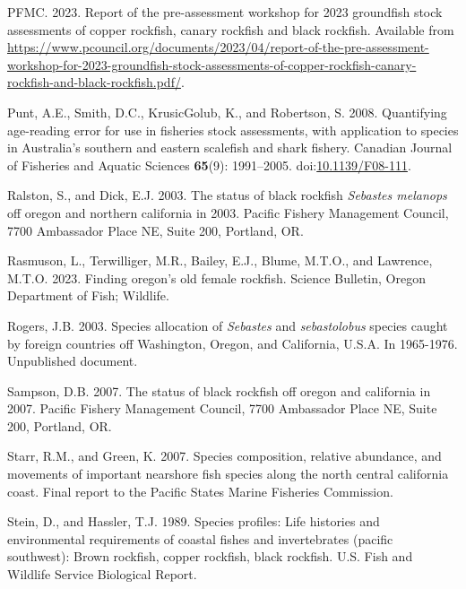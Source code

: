 \documentclass[11pt,
  letterpaper,
]{article}
\newlength{\cslhangindent}
\newenvironment{CSLReferences}[2] %
 {%
  \setlength{\parindent}{0pt}
  \ifodd #1 \everypar{\setlength{\hangindent}{\cslhangindent}}\ignorespaces\fi
  \ifnum #2 > 0
  \setlength{\parskip}{#2\baselineskip}
  \fi
 }%
 {}
\begin{document}
\begin{CSLReferences}{1}{0}
\leavevmode{}%
PFMC. 2023. Report of the pre-assessment workshop for 2023 groundfish stock assessments of copper rockfish, canary rockfish and black rockfish. Available from \url{https://www.pcouncil.org/documents/2023/04/report-of-the-pre-assessment-workshop-for-2023-groundfish-stock-assessments-of-copper-rockfish-canary-rockfish-and-black-rockfish.pdf/}.

\leavevmode{}%
Punt, A.E., Smith, D.C., KrusicGolub, K., and Robertson, S. 2008. Quantifying age-reading error for use in fisheries stock assessments, with application to species in {A}ustralia's southern and eastern scalefish and shark fishery. Canadian Journal of Fisheries and Aquatic Sciences \textbf{65}(9): 1991--2005. doi:\href{https://doi.org/10.1139/F08-111}{10.1139/F08-111}.

\leavevmode{}%
Ralston, S., and Dick, E.J. 2003. The status of black rockfish \emph{{Sebastes} melanops} off oregon and northern california in 2003. Pacific Fishery Management Council, 7700 Ambassador Place NE, Suite 200, Portland, OR.

\leavevmode{}%
Rasmuson, L., Terwilliger, M.R., Bailey, E.J., Blume, M.T.O., and Lawrence, M.T.O. 2023. Finding oregon's old female rockfish. Science Bulletin, Oregon Department of Fish; Wildlife.

\leavevmode{}%
Rogers, J.B. 2003. Species allocation of \emph{{Sebastes}} and \emph{sebastolobus} species caught by foreign countries off {Washington}, {Oregon}, and {California}, {U}.{S}.{A}. In 1965-1976. Unpublished document.

\leavevmode{}%
Sampson, D.B. 2007. The status of black rockfish off oregon and california in 2007. Pacific Fishery Management Council, 7700 Ambassador Place NE, Suite 200, Portland, OR.

\leavevmode{}%
Starr, R.M., and Green, K. 2007. Species composition, relative abundance, and movements of important nearshore fish species along the north central california coast. Final report to the Pacific States Marine Fisheries Commission.

\leavevmode{}%
Stein, D., and Hassler, T.J. 1989. Species profiles: Life histories and environmental requirements of coastal fishes and invertebrates (pacific southwest): Brown rockfish, copper rockfish, black rockfish. U.S. Fish and Wildlife Service Biological Report.


\end{CSLReferences}
\end{document}
